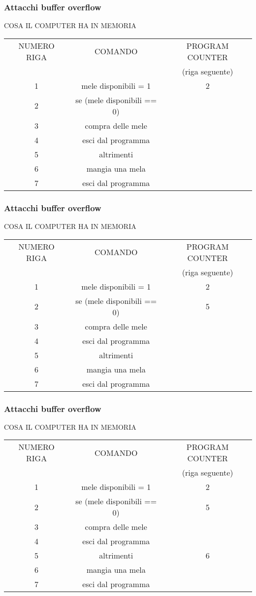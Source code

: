 \documentclass[italian,aspectratio=169]{beamer}
\begin{document}
\begin{frame}
 \frametitle{Attacchi buffer overflow}
 COSA IL COMPUTER HA IN MEMORIA
 \begin{center}
 \begin{tabular}{|c|c|c|}
\hline 
{NUMERO RIGA} & {COMANDO} & {PROGRAM COUNTER}\tabularnewline
{}&{}&{(riga seguente)}\tabularnewline
\hline 
\hline 
{1} & {mele disponibili = 1} & {2}\tabularnewline
\hline
{2} & {se (mele disponibili == 0)} & {}\tabularnewline
\hline
{3} & {compra delle mele} & {}\tabularnewline
\hline
{4} & {esci dal programma} & {}\tabularnewline
\hline
{5} & {altrimenti} & {}\tabularnewline
\hline
{6} & {mangia una mela} & {}\tabularnewline
\hline
{7} & {esci dal programma} & {}\tabularnewline
\hline 
\end{tabular}
\end{center}
\end{frame}

\begin{frame}
 \frametitle{Attacchi buffer overflow}
 COSA IL COMPUTER HA IN MEMORIA
 \begin{center}
 \begin{tabular}{|c|c|c|}
\hline 
{NUMERO RIGA} & {COMANDO} & {PROGRAM COUNTER}\tabularnewline
{}&{}&{(riga seguente)}\tabularnewline
\hline 
\hline 
{1} & {mele disponibili = 1} & {2}\tabularnewline
\hline
{2} & {se (mele disponibili == 0)} & {5}\tabularnewline
\hline
{3} & {compra delle mele} & {}\tabularnewline
\hline
{4} & {esci dal programma} & {}\tabularnewline
\hline
{5} & {altrimenti} & {}\tabularnewline
\hline
{6} & {mangia una mela} & {}\tabularnewline
\hline
{7} & {esci dal programma} & {}\tabularnewline
\hline 
\end{tabular}
\end{center}
\end{frame}

\begin{frame}
 \frametitle{Attacchi buffer overflow}
 COSA IL COMPUTER HA IN MEMORIA
 \begin{center}
 \begin{tabular}{|c|c|c|}
\hline 
{NUMERO RIGA} & {COMANDO} & {PROGRAM COUNTER}\tabularnewline
{}&{}&{(riga seguente)}\tabularnewline
\hline 
\hline 
{1} & {mele disponibili = 1} & {2}\tabularnewline
\hline
{2} & {se (mele disponibili == 0)} & {5}\tabularnewline
\hline
{3} & {compra delle mele} & {}\tabularnewline
\hline
{4} & {esci dal programma} & {}\tabularnewline
\hline
{5} & {altrimenti} & {6}\tabularnewline
\hline
{6} & {mangia una mela} & {}\tabularnewline
\hline
{7} & {esci dal programma} & {}\tabularnewline
\hline 
\end{tabular}
\end{center}
\end{frame}
\end{document}

